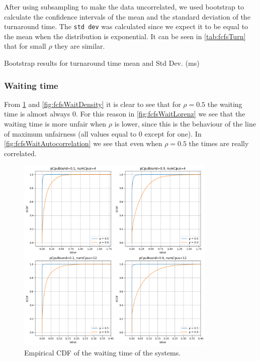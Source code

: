 After using subsampling to make the data uncorrelated, we used bootstrap to calculate the confidence intervals of the mean and the standard deviation of the turnaround time. The \texttt{std dev} was calculated since we expect it to be equal to the mean when the distribution is exponential. It can be seen in \cref{tab:fcfsTurn} that for small $\rho$ they are similar.

\begin{table}[H]
    \centering
    \scriptsize
    
    \caption{Bootstrap results for turnaround time mean and Std Dev. (ms)}
    \label{tab:fcfsTurn}
\end{table}


\subsubsection{Waiting time}

From \cref{fig:fcfsWaitEcdf} and \cref{fig:fcfsWaitDensity} it is clear to see that 
for $\rho = 0.5$ the waiting time is almost always $0$. For this reason in 
\cref{fig:fcfsWaitLorenz} we see that the waiting time is more unfair when $\rho$ 
is lower, since this is the behaviour of the line of maximum unfairness 
(all values equal to 0 except for one). In \cref{fig:fcfsWaitAutocorrelation} we 
see that even when $\rho = 0.5$ the times are really correlated.

\begin{figure}[H]
    \captionsetup{type=figure}
    \centering
    \includegraphics[width=0.85\textwidth]{./images/04/fcfs/wait/ecdf.png}
    \caption{Empirical CDF of the waiting time of the systems.}
    \label{fig:fcfsWaitEcdf}
\end{figure}

